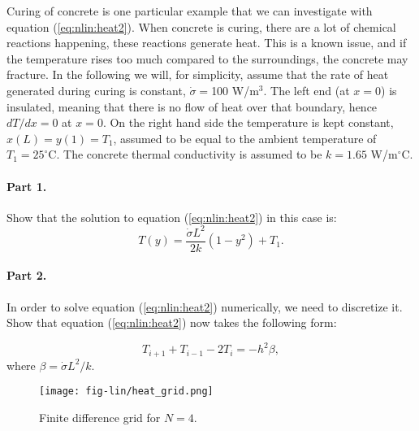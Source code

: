 \documentclass[graybox,sectrefs,envcountresetchap,open=right,final]{svmonodo}
\makeatletter
\newenvironment{doconceexercise}{}{}
\newcounter{doconceexercisecounter}%
\newcommand\listofexercises{
\chapter*{List of Exercises
          \@mkboth{List of Exercises}{List of Exercises}}
\markboth{List of Exercises}{List of Exercises}
\@starttoc{loe}
}
\makeatother
\begin{document}
\begin{doconceexercise}

                             

Curing of concrete is one particular example that we can investigate
with equation (\ref{eq:nlin:heat2}). When concrete is curing, there are
a lot of chemical reactions happening, these reactions generate
heat. This is a known issue, and if the temperature rises too much 
compared to the surroundings, the concrete may fracture.  In the
following we will, for simplicity, assume that the rate of heat
generated during curing is constant, $\dot{\sigma}=$100 W/m$^3$. The
left end (at $x=0$) is insulated, meaning that there is no flow of
heat over that boundary, hence $dT/dx=0$ at $x=0$. On the right hand
side the temperature is kept constant, $x(L)=y(1)=T_1$, assumed to be
equal to the ambient temperature of $T_1=25^\circ$C.  The concrete
thermal conductivity is assumed to be $k=1.65$ W/m$^\circ$C.

\paragraph{Part 1.}

Show that the solution to equation (\ref{eq:nlin:heat2}) in this case is:
\begin{equation}
T(y)=\frac{\dot{\sigma}L^2}{2k}(1-y^2)+T_1.
\label{eq:nlin:heatsol}
\end{equation}

\paragraph{Part 2.}
In order to solve equation (\ref{eq:nlin:heat2}) numerically, we need to discretize
it. Show that equation (\ref{eq:nlin:heat2}) now takes the following form:

\begin{equation}
T_{i+1}+T_{i-1}-2T_i=-h^2\beta,
\label{eq:nlin:heat3}
\end{equation}
where $\beta=\dot{\sigma}L^2/k$.

\begin{figure}[!ht]  %
  \centerline{\texttt{[image: fig-lin/heat\_grid.png]}}
  \caption{
  Finite difference grid for $N=4$. \label{fig:nlin:hgrid}
  }
\end{figure}


\end{doconceexercise}
\end{document}

